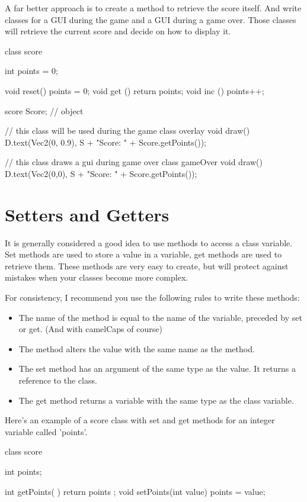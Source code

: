 A far better approach is to create a method to retrieve the score itself. And write classes for a GUI during the game and a GUI during a game over. Those classes will retrieve the current score and decide on how to display it.

\begin{code}
class score {
  int points = 0;
  
  void reset() { points = 0;    }
  void get  () { return points; }
  void inc  () { points++;      }
}
score Score; // object

// this class will be used during the game
class overlay {
  void draw() {
    D.text(Vec2(0, 0.9), S + "Score: " + Score.getPoints());
  }
}

// this class draws a gui during game over
class gameOver {
  void draw() {
    D.text(Vec2(0,0), S + "Score: " + Score.getPoints());
  } 
}
\end{code}

\section{Setters and Getters}
It is generally considered a good idea to use methods to access a class variable. Set methods are used to store a value in a variable, get methods are used to retrieve them. These methods are very easy to create, but will protect against mistakes when your classes become more complex.

For consistency, I recommend you use the following rules to write these methods:

\begin{itemize}
\item The name of the method is equal to the name of the variable, preceded by set or get. (And with camelCaps of course)
\item The method alters the value with the same name as the method.
\item The set method has an argument of the same type as the value. It returns a reference to the class.
\item The get method returns a variable with the same type as the class variable.
\end{itemize}

Here's an example of a score class with set and get methods for an integer variable called 'points'.

\begin{code}
class score {
  int points;
  
  int  getPoints(         ) { return points ; }
  void setPoints(int value) { points = value; }
}
\end{code}

